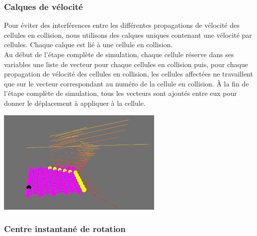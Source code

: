 \documentclass[a4paper,11pt]{article}
\begin{document}
\subsubsection{Calques de vélocité}

Pour éviter des interférences entre les différentes propagations de vélocité des cellules en collision, nous utilisons des calques uniques contenant une vélocité par cellules. Chaque calque est lié à une cellule en collision.\\
Au début de l'étape complète de simulation, chaque cellule réserve dans ses variables une liste de vecteur pour chaque cellules en collision puis, pour chaque propagation de vélocité des cellules en collision, les cellules affectées ne travaillent que sur le vecteur correspondant au numéro de la cellule en collision.
À la fin de l'étape complète de simulation, tous les vecteurs sont ajoutés entre eux pour donner le déplacement à appliquer à la cellule. \\

\begin{center}
  \includegraphics[width=8cm]{Images/calque.png}
\end{center}

\subsubsection{Centre instantané de rotation}
\end{document}
